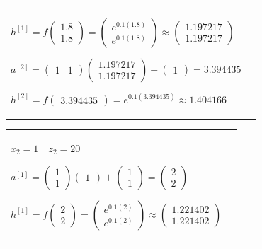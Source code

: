 \documentclass[11pt,a4paper]{article}
\begin{document}
\begin{flushleft}
\begin{tabularx}{1.09\textwidth}{X X}
  $ h^{[1]} = f \begin{pmatrix} 1.8 \\ 1.8 \end{pmatrix} = \begin{pmatrix} e^{0.1(1.8)} \\ e^{0.1(1.8)} \end{pmatrix} \approx \begin{pmatrix} 1.197217 \\ 1.197217 \end{pmatrix} $ \par \vspace{1mm}
  $ a^{[2]} = \begin{pmatrix} 1 & 1 \end{pmatrix} \begin{pmatrix} 1.197217 \\ 1.197217 \end{pmatrix} + \begin{pmatrix} 1 \end{pmatrix} = 3.394435 $ \par \vspace{1mm}
  $ h^{[2]} = f \begin{pmatrix} 3.394435 \end{pmatrix} = e^{0.1(3.394435)} \approx 1.404166 $ \par \vspace{1mm}
\end{tabularx}
\begin{tabularx}{1.09\textwidth}{X X}
  $ \boxed{x_2 = 1} \quad z_2 = 20 $ \par \vspace{1mm}
  $ a^{[1]} = \begin{pmatrix} 1 \\ 1 \end{pmatrix} \begin{pmatrix} 1 \end{pmatrix} + \begin{pmatrix} 1 \\ 1 \end{pmatrix} = \begin{pmatrix} 2 \\ 2 \end{pmatrix} $ \par \vspace{1mm}
  $ h^{[1]} = f \begin{pmatrix} 2 \\ 2 \end{pmatrix} = \begin{pmatrix} e^{0.1(2)} \\ e^{0.1(2)} \end{pmatrix} \approx \begin{pmatrix} 1.221402 \\ 1.221402 \end{pmatrix} $ \par \vspace{1mm}

\end{tabularx}
\end{flushleft}
\end{document}
